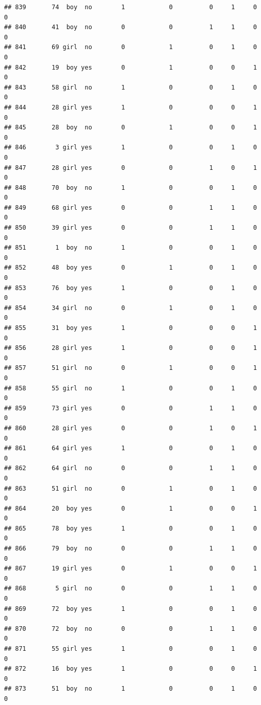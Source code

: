 \documentclass[man]{apa6}
\begin{document}
\begin{verbatim}
## 839       74  boy  no        1            0          0     1     0     0
## 840       41  boy  no        0            0          1     1     0     0
## 841       69 girl  no        0            1          0     1     0     0
## 842       19  boy yes        0            1          0     0     1     0
## 843       58 girl  no        1            0          0     1     0     0
## 844       28 girl yes        1            0          0     0     1     0
## 845       28  boy  no        0            1          0     0     1     0
## 846        3 girl yes        1            0          0     1     0     0
## 847       28 girl yes        0            0          1     0     1     0
## 848       70  boy  no        1            0          0     1     0     0
## 849       68 girl yes        0            0          1     1     0     0
## 850       39 girl yes        0            0          1     1     0     0
## 851        1  boy  no        1            0          0     1     0     0
## 852       48  boy yes        0            1          0     1     0     0
## 853       76  boy yes        1            0          0     1     0     0
## 854       34 girl  no        0            1          0     1     0     0
## 855       31  boy yes        1            0          0     0     1     0
## 856       28 girl yes        1            0          0     0     1     0
## 857       51 girl  no        0            1          0     0     1     0
## 858       55 girl  no        1            0          0     1     0     0
## 859       73 girl yes        0            0          1     1     0     0
## 860       28 girl yes        0            0          1     0     1     0
## 861       64 girl yes        1            0          0     1     0     0
## 862       64 girl  no        0            0          1     1     0     0
## 863       51 girl  no        0            1          0     1     0     0
## 864       20  boy yes        0            1          0     0     1     0
## 865       78  boy yes        1            0          0     1     0     0
## 866       79  boy  no        0            0          1     1     0     0
## 867       19 girl yes        0            1          0     0     1     0
## 868        5 girl  no        0            0          1     1     0     0
## 869       72  boy yes        1            0          0     1     0     0
## 870       72  boy  no        0            0          1     1     0     0
## 871       55 girl yes        1            0          0     1     0     0
## 872       16  boy yes        1            0          0     0     1     0
## 873       51  boy  no        1            0          0     1     0     0

\end{verbatim}
\end{document}
